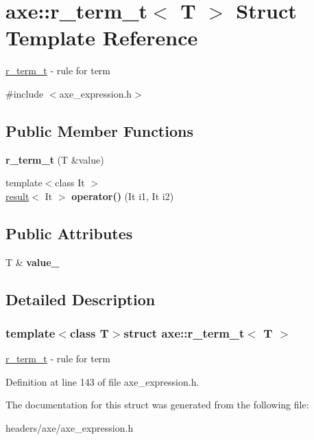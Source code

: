 \hypertarget{structaxe_1_1r__term__t}{\section{axe\+:\+:r\+\_\+term\+\_\+t$<$ T $>$ Struct Template Reference}
\label{structaxe_1_1r__term__t}
}


\hyperlink{structaxe_1_1r__term__t}{r\+\_\+term\+\_\+t} -\/ rule for term  




{\ttfamily \#include $<$axe\+\_\+expression.\+h$>$}

\subsection*{Public Member Functions}
\begin{DoxyCompactItemize}
\item 
\hypertarget{structaxe_1_1r__term__t_a2ce435c12335e23499644a7aee64a178}{{\bfseries r\+\_\+term\+\_\+t} (T \&value)}\label{structaxe_1_1r__term__t_a2ce435c12335e23499644a7aee64a178}

\item 
\hypertarget{structaxe_1_1r__term__t_a3a58f252f15d97514dedd2e9bf597778}{{\footnotesize template$<$class It $>$ }\\\hyperlink{structaxe_1_1result}{result}$<$ It $>$ {\bfseries operator()} (It i1, It i2)}\label{structaxe_1_1r__term__t_a3a58f252f15d97514dedd2e9bf597778}

\end{DoxyCompactItemize}
\subsection*{Public Attributes}
\begin{DoxyCompactItemize}
\item 
\hypertarget{structaxe_1_1r__term__t_a761c234dc3d2cf3bd94fbe1fa3823470}{T \& {\bfseries value\+\_\+}}\label{structaxe_1_1r__term__t_a761c234dc3d2cf3bd94fbe1fa3823470}

\end{DoxyCompactItemize}


\subsection{Detailed Description}
\subsubsection*{template$<$class T$>$struct axe\+::r\+\_\+term\+\_\+t$<$ T $>$}

\hyperlink{structaxe_1_1r__term__t}{r\+\_\+term\+\_\+t} -\/ rule for term 

Definition at line 143 of file axe\+\_\+expression.\+h.



The documentation for this struct was generated from the following file\+:\begin{DoxyCompactItemize}
\item 
headers/axe/axe\+\_\+expression.\+h\end{DoxyCompactItemize}
